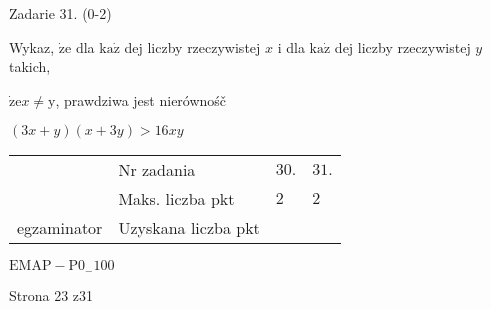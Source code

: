 \documentclass[a4paper,12pt]{article}
\begin{document}
Zadarie 31. (0-2)

Wykaz, $\dot{\mathrm{z}}\mathrm{e}$ dla $\mathrm{k}\mathrm{a}\dot{\mathrm{z}}$ dej liczby rzeczywistej $x$ i dla $\mathrm{k}\mathrm{a}\dot{\mathrm{z}}$ dej liczby rzeczywistej $y$ takich,

$\dot{\mathrm{z}}\mathrm{e} x\neq \mathrm{y}$, prawdziwa jest nierównośč

$(3x+y)(x+3y)>16xy$
\begin{center}
\begin{tabular}{|l|l|l|l|}
\cline{2-4}
&	\multicolumn{1}{|l|}{Nr zadania}&	\multicolumn{1}{|l|}{$30.$}&	\multicolumn{1}{|l|}{ $31.$}	\\
\cline{2-4}
&	\multicolumn{1}{|l|}{Maks. liczba pkt}&	\multicolumn{1}{|l|}{$2$}&	\multicolumn{1}{|l|}{ $2$}	\\
\cline{2-4}
\multicolumn{1}{|l|}{egzaminator}&	\multicolumn{1}{|l|}{Uzyskana liczba pkt}&	\multicolumn{1}{|l|}{}&	\multicolumn{1}{|l|}{}	\\
\hline
\end{tabular}

\end{center}
$\mathrm{E}\mathrm{M}\mathrm{A}\mathrm{P}-\mathrm{P}0_{-}100$

Strona 23 z31
\end{document}
